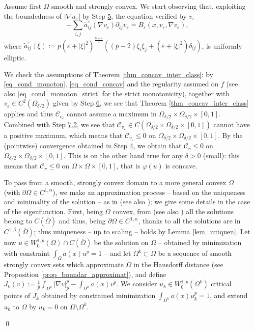 \documentclass[11pt, reqno]{amsart}
\theoremstyle{definition}
\numberwithin{equation}{section}
\newcommand{\mc}[1]{\mathcal{#1}}
\def\eps{\varepsilon}
\renewenvironment{proof}[1][\proofname]{\medskip \noindent {\bfseries #1. }}{\qed \bigskip}
\begin{document}
\begin{proof}
Assume first $\Omega$ smooth and strongly convex.
We start observing that, exploiting the boundedness of $|\nabla u_{\eps}|$ by Step \hyperlink{Step5}{\rm{5}}, the equation verified by $v_{\eps}$
$$-\sum_{i,j}\tilde{a}^{\eps}_{ij}(\nabla v_{\eps}) \partial_{ij} v_{\eps} = B_{\eps}(x,v_{\eps},\nabla v_{\eps}),$$
where $\tilde{a}^{\eps}_{ij}(\xi) := p (\eps + |\xi|^2)^{\frac{p-4}{2}} \left( (p-2) \xi_i \xi_j + (\eps + |\xi|^2) \delta_{ij}\right)$, is uniformly elliptic.

We check the assumptions of Theorem \ref{thm_concav_inter_class}: by \eqref{eq_cond_monoton}, \eqref{eq_cond_concav} and the regularity assumed on $f$ (see also \eqref{eq_cond_monoton_strict} for the strict monotonicity), together with $v_{\eps} \in C^2(\Omega_{\delta/2})$ given by Step \hyperlink{Step6}{\rm{6}}, we see that Theorem \ref{thm_concav_inter_class} applies and thus $\mc{C}_{v_{\eps}} $ cannot assume a maximum in $\Omega_{\delta/2} \times \Omega_{\delta/2} \times [0,1]$. 
Combined with Step \hyperlink{Step7.2}{\rm{7.2}}, we see that $\mc{C}_{v_{\eps}}\in C(\overline{\Omega_{\delta/2}} \times \overline{\Omega_{\delta/2}} \times [0,1])$ cannot have a positive maximum, which means that $\mc{C}_{v_{\eps}} \leq 0$ on $\Omega_{\delta/2} \times \Omega_{\delta/2} \times [0,1]$. 
By the (pointwise) convergence obtained in Step \hyperlink{Step4}{\rm{4}}, we obtain that $\mc{C}_{v} \leq 0$ on $\Omega_{\delta/2} \times \Omega_{\delta/2} \times [0,1]$.
This is on the other hand true for any $\delta>0$ (small): this means that $\mc{C}_{v} \leq 0$ on $\Omega \times \Omega \times [0,1]$, that is $\varphi(u)$ is concave.

To pass from a smooth, strongly convex domain to a more general convex $\Omega$ (with $\partial \Omega \in C^{1,\alpha}$), we make an approximation process -- based on the uniqueness and minimality of the solution -- as in \cite[Section 4.1]{BMS22} (see also \cite[Section 5]{Sak87}); we give some details in the case of the eigenfunction.
First, being $\Omega$ convex, from \cite[Corollary 4.2]{Tru67} (see also \cite[Corollary 3.7]{CaDe04})
all the solutions belong to $C(\overline{\Omega})$ and thus, being $\partial \Omega \in C^{1,\alpha}$, thanks to \cite[Theorem 1]{Lie88} all the solutions are in $C^{1,\beta}(\overline{\Omega})$; thus uniqueness -- up to scaling -- holds by Lemma \ref{lem_uniquen}.
Let now $u \in W^{1,p}_0(\Omega) \cap C(\overline{\Omega})$ be the solution on $\Omega$ -- obtained by minimization with constraint $\int_{\Omega} a(x) u^p = 1$ -- and let $\Omega^k \subset \Omega $ be a sequence of smooth strongly convex sets which approximate $\Omega$ in the Hausdorff distance (see Proposition \ref{prop_boundar_approximat}), and define $J_k(v):= \frac{1}{p} \int_{\Omega^k} |\nabla v|_p^p - \int_{\Omega^k} a(x) v^p$. 
We consider $u_k \in W^{1,p}_0(\Omega^k)$ critical points of $J_k$ obtained by constrained minimization $\int_{\Omega^k} a(x) u_k^p = 1$, and extend $u_k$ to $\Omega$ by $u_{k}=0$ on $\Omega \setminus \Omega^k$. 


\end{proof}
\end{document}
